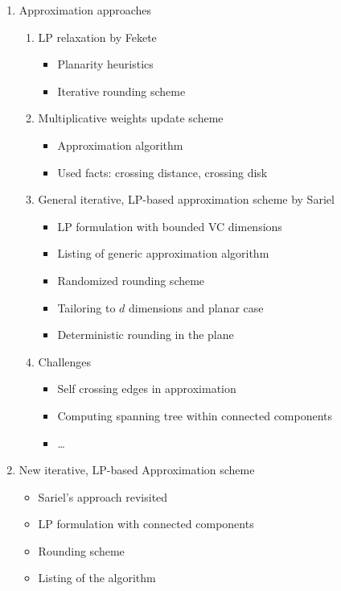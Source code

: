 \documentclass[a4paper,pagesize]{scrartcl}
\begin{document}
\begin{enumerate}
        \item Approximation approaches
            \begin{enumerate}
                \item LP relaxation by Fekete
                    \begin{itemize}
                        \item Planarity heuristics
                        \item Iterative rounding scheme
                    \end{itemize}
                \item Multiplicative weights update scheme
                    \begin{itemize}
                        \item Approximation algorithm
                        \item Used facts: crossing distance, crossing disk
                    \end{itemize}
                \item General iterative, LP-based approximation scheme by Sariel
                    \begin{itemize}
                        \item LP formulation with bounded VC dimensions
                        \item Listing of generic approximation algorithm
                        \item Randomized rounding scheme
                        \item Tailoring to $d$ dimensions and planar case
                        \item Deterministic rounding in the plane
                    \end{itemize}
                \item Challenges
                    \begin{itemize}
                        \item Self crossing edges in approximation
                        \item Computing spanning tree within connected
                            components
                        \item \dots
                    \end{itemize}
            \end{enumerate}

        \item New iterative, LP-based Approximation scheme
            \begin{itemize}
                \item Sariel's approach revisited
                \item LP formulation with connected components
                \item Rounding scheme
                \item Listing of the algorithm
            \end{itemize}


\end{enumerate}
\end{document}
